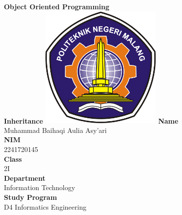 \documentclass[12pt,titlepage]{article}
\newcommand{\vSubject}{Object Oriented Programming}
\newcommand{\vSubtitle}{Inheritance}
\newcommand{\vName}{Muhammad Baihaqi Aulia Asy'ari}
\newcommand{\vNIM}{2241720145}
\newcommand{\vClass}{2I}
\newcommand{\vDepartment}{Information Technology}
\newcommand{\vStudyProgram}{D4 Informatics Engineering}
\begin{document}
\begin{titlepage}
    \centering
    \vfill
    {\bfseries\LARGE
        \vSubject\\
        \vskip0.25cm
        \vSubtitle
    }
    \vfill
    \includegraphics[width=6cm]{images/polinema-logo.png}
    \vfill
    {
        \textbf{Name}\\
        \vName\\
        \vskip0.5cm
        \textbf{NIM}\\
        \vNIM\\
        \vskip0.5cm
        \textbf{Class}\\
        \vClass\\
        \vskip0.5cm
        \textbf{Department}\\
        \vDepartment\\
        \vskip0.5cm
        \textbf{Study Program}\\
        \vStudyProgram
    }
\end{titlepage}

\newpage
\end{document}
